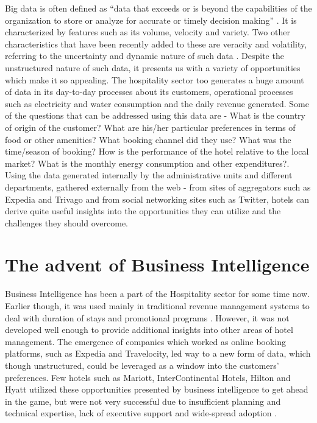 \documentclass[sigconf]{acmart}
\begin{document}
Big data is often defined as ``data that exceeds or is beyond the capabilities of the organization to store or analyze for accurate or timely decision making'' \cite {phillipswrenhoskisson01}. It is characterized by features such as its volume, velocity and variety. Two other characteristics that have been recently added to these are veracity and volatility, referring to the uncertainty and dynamic nature of such data \cite {phillipswrenhoskisson01}. Despite the unstructured nature of such data, it presents us with a variety of opportunities which make it so appealing.
\newline The hospitality sector too generates a huge amount of data in its day-to-day processes about its customers, operational processes such as electricity and water consumption and the daily revenue generated. Some of the questions that can be addressed using this data are - What is the country of origin of the customer? What are his/her particular preferences in terms of food or other amenities? What booking channel did they use? What was the time/season of booking? How is the performance of the hotel relative to the local market? What is the monthly energy consumption and other expenditures?\cite {bigdatapredictive02}.
\newline Using the data generated internally by the administrative units and different departments, gathered externally from the web - from sites of aggregators such as Expedia and Trivago and from social networking sites such as Twitter, hotels can derive quite useful insights into the opportunities they can utilize and the challenges they should overcome. 

\section{The advent of Business Intelligence}

Business Intelligence has been a part of the Hospitality sector for some time now. Earlier though, it was used mainly in traditional revenue management systems to deal with duration of stays and promotional programs \cite {kortefrolick03}. However, it was not developed well enough to provide additional insights into other areas of hotel management. The emergence of companies which worked as online booking platforms, such as Expedia and Travelocity, led way to a new form of data, which though unstructured, could be leveraged as a window into the customers' preferences. Few hotels such as Mariott, InterContinental Hotels, Hilton and Hyatt utilized these opportunities presented by business intelligence to get ahead in the game, but were not very successful due to insufficient planning and technical expertise, lack of executive support and wide-spread adoption \cite {kortefrolick03}.
\end{document}
